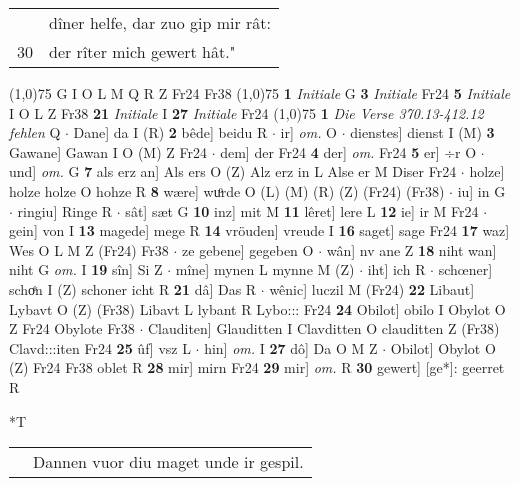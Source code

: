 \documentclass[8pt,a4paper,notitlepage]{article}
\begin{document}
\begin{table}[ht]
\begin{minipage}[t]{0.5\linewidth}
\begin{tabular}{rl}
 & dîner helfe, dar zuo gip mir rât:\\ 
30 & der rîter mich gewert hât."\\ 
\end{tabular}
\scriptsize
\line(1,0){75} \newline
G I O L M Q R Z Fr24 Fr38 \newline
\line(1,0){75} \newline
\textbf{1} \textit{Initiale} G  \textbf{3} \textit{Initiale} Fr24  \textbf{5} \textit{Initiale} I O L Z Fr38  \textbf{21} \textit{Initiale} I  \textbf{27} \textit{Initiale} Fr24  \newline
\line(1,0){75} \newline
\textbf{1} \textit{Die Verse 370.13-412.12 fehlen} Q   $\cdot$ Dane] da I (R) \textbf{2} bêde] beidu R  $\cdot$ ir] \textit{om.} O  $\cdot$ dienstes] dienst I (M) \textbf{3} Gawane] Gawan I O (M) Z Fr24  $\cdot$ dem] der Fr24 \textbf{4} der] \textit{om.} Fr24 \textbf{5} er] ÷r O  $\cdot$ und] \textit{om.} G \textbf{7} als erz an] Als ers O (Z) Alz erz in L Alse er M Diser Fr24  $\cdot$ holze] holze holze O hohze R \textbf{8} wære] wuͦrde O (L) (M) (R) (Z) (Fr24) (Fr38)  $\cdot$ iu] in G  $\cdot$ ringiu] Ringe R  $\cdot$ sât] sæt G \textbf{10} inz] mit M \textbf{11} lêret] lere L \textbf{12} ie] ir M Fr24  $\cdot$ gein] von I \textbf{13} magede] mege R \textbf{14} vröuden] vreude I \textbf{16} saget] sage Fr24 \textbf{17} waz] Wes O L M Z (Fr24) Fr38  $\cdot$ ze gebene] gegeben O  $\cdot$ wân] nv ane Z \textbf{18} niht wan] niht G \textit{om.} I \textbf{19} sîn] Si Z  $\cdot$ mîne] mynen L mynne M (Z)  $\cdot$ iht] ich R  $\cdot$ schœner] schoͤn I (Z) schoner icht R \textbf{21} dâ] Das R  $\cdot$ wênic] luczil M (Fr24) \textbf{22} Libaut] Lybavt O (Z) (Fr38) Libavt L lybant R Lybo::: Fr24 \textbf{24} Obilot] obilo I Obylot O Z Fr24 Obylote Fr38  $\cdot$ Clauditen] Glauditten I Clavditten O clauditten Z (Fr38) Clavd:::iten Fr24 \textbf{25} ûf] vsz L  $\cdot$ hin] \textit{om.} I \textbf{27} dô] Da O M Z  $\cdot$ Obilot] Obylot O (Z) Fr24 Fr38 oblet R \textbf{28} mir] mirn Fr24 \textbf{29} mir] \textit{om.} R \textbf{30} gewert] [ge*]: geerret R \newline
\end{minipage}
\hspace{0.5cm}
\begin{minipage}[t]{0.5\linewidth}
\small
\begin{center}*T
\end{center}
\begin{tabular}{rl}
 & Dannen vuor diu maget unde ir gespil.\\ 

\end{tabular}
\end{minipage}
\end{table}
\end{document}
